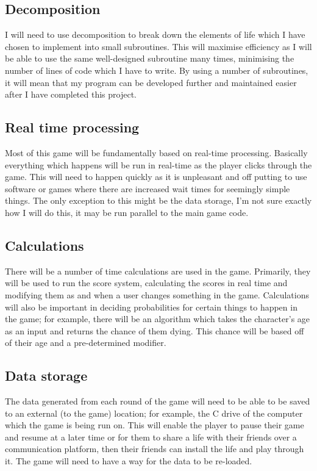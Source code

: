 \subsection{Decomposition}
I will need to use decomposition to break down the elements of life which I have chosen to implement into small subroutines. This will maximise efficiency as I will be able to use the same well-designed subroutine many times, minimising the number of lines of code which I have to write. By using a number of subroutines, it will mean that my program can be developed further and maintained easier after I have completed this project.
\subsection{Real time processing}
Most of this game will be fundamentally based on real-time processing. Basically everything which happens will be run in real-time as the player clicks through the game. This will need to happen quickly as it is unpleasant and off putting to use software or games where there are increased wait times for seemingly simple things. \newline
The only exception to this might be the data storage, I'm not sure exactly how I will do this, it may be run parallel to the main game code.
\subsection{Calculations}
There will be a number of time calculations are used in the game. Primarily, they will be used to run the score system, calculating the scores in real time and modifying them as and when a user changes something in the game. Calculations will also be important in deciding probabilities for certain things to happen in the game; for example, there will be an algorithm which takes the character's age as an input and returns the chance of them dying. This chance will be based off of their age and a pre-determined modifier.
\subsection{Data storage}
The data generated from each round of the game will need to be able to be saved to an external (to the game) location; for example, the C drive of the computer which the game is being run on. This will enable the player to pause their game and resume at a later time or for them to share a life with their friends over a communication platform, then their friends can install the life and play through it. The game will need to have a way for the data to be re-loaded.


